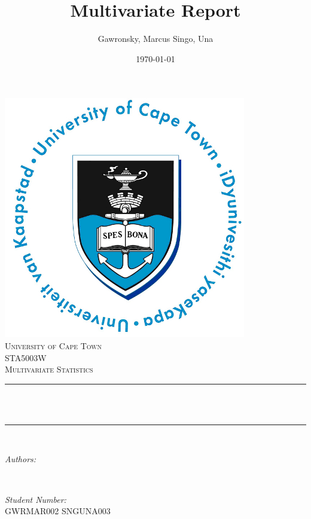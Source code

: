 \documentclass[12pt]{article}
\title{Multivariate Report}								%
\author{Gawronsky, Marcus \newline Singo, Una}
\date{\today}											%
\makeatletter
\let\thetitle\@title
\let\theauthor\@author
\let\thedate\@date
\makeatother
\begin{document}

\begin{titlepage}
	\centering
    \vspace*{0.5 cm}
    \includegraphics[scale = 0.75]{UCT.jpg}\\[1.0 cm]	%
    \textsc{\LARGE University of Cape Town}\\[2.0 cm]	%
	\textsc{\Large STA5003W}\\[0.5 cm]				%
	\textsc{\large Multivariate Statistics}\\[0.5 cm]				%
	\rule{\linewidth}{0.2 mm} \\[0.4 cm]
	{ \huge \bfseries \thetitle}\\
	\rule{\linewidth}{0.2 mm} \\[1.5 cm]
	
	\begin{minipage}{0.4\textwidth}
		\begin{flushleft} \large
			\emph{Authors:}\\
			\theauthor
			\end{flushleft}
			\end{minipage}~
			\begin{minipage}{0.4\textwidth}
			\begin{flushright} \large
			\emph{Student Number:} \\
            GWRMAR002 SNGUNA003									%
            
		\end{flushright}
	\end{minipage}\\[2 cm]
	
	{\large \thedate}\\[2 cm]
 
	\vfill
	
\end{titlepage}
\end{document}
